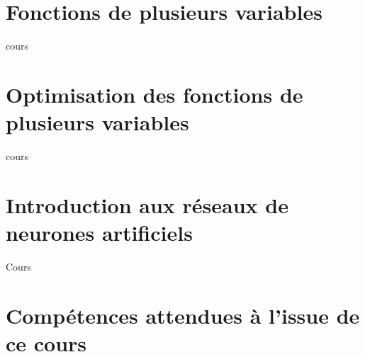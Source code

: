 \documentclass[fleqn,a4paper,11pt]{book}
\title{}
\begin{document}
\tableofcontents
\newpage

\newcommand{\myscale}{1}
\newcommand{\couleurnb}[2]{#2}
\newcommand{\mybox}[1]{\begin{center}\tikz{\node[block]{#1};}\end{center}}
\newcommand{\mystar}{\star}

\chapter{Fonctions de plusieurs variables}

{cours}

\newpage

\chapter{Optimisation des fonctions de plusieurs variables}

{cours}

\newpage

\chapter{Introduction aux réseaux de neurones artificiels}
{Cours}

\newpage



\appendix
\chapter{Compétences attendues à l'issue de ce cours}

\end{document}
